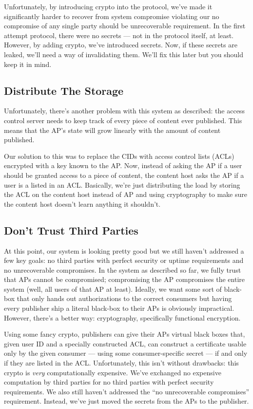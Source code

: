 \documentclass[pdftex,12pt,a4papaer]{report}
\begin{document}
Unfortunately, by introducing crypto into the protocol, we've made it
significantly harder to recover from system compromise violating our no
compromise of any single party should be unrecoverable requirement. In the first
attempt protocol, there were no secrets --- not in the protocol itself, at
least. However, by adding crypto, we've introduced secrets. Now, if these
secrets are leaked, we'll need a way of invalidating them. We'll fix this later
but you should keep it in mind.

\subsection{Distribute The Storage}

Unfortunately, there's another problem with this system as described: the access
control server needs to keep track of every piece of content ever published.
This means that the AP's state will grow linearly with the amount of content
published.

Our solution to this was to replace the CIDs with access control lists (ACLs)
encrypted with a key known to the AP. Now, instead of asking the AP if a user
should be granted access to a piece of content, the content host asks the AP if
a user is a listed in an ACL. Basically, we're just distributing the load by
storing the ACL on the content host instead of AP and using cryptography to make
sure the content host doesn't learn anything it shouldn't.

\subsection{Don't Trust Third Parties}

At this point, our system is looking pretty good but we still haven't addressed
a few key goals: no third parties with perfect security or uptime requirements
and no unrecoverable compromises. In the system as described so far, we fully
trust that APs cannot be compromised; compromising the AP compromises the entire
system (well, all users of that AP at least). Ideally, we want some sort of
black-box that only hands out authorizations to the correct consumers but having
every publisher ship a literal black-box to their APs is obviously
impractical. However, there's a better way: cryptography, specifically
functional encryption.

Using some fancy crypto, publishers can give their APs virtual black boxes
that, given user ID and a specially constructed ACL, can construct a certificate
usable only by the given consumer --- using some consumer-specific secret --- if
and only if they are listed in the ACL. Unfortunately, this isn't without
drawbacks: this crypto is \emph{very} computationally expensive. We've exchanged
no expensive computation by third parties for no third parties with perfect
security requirements. We also still haven't addressed the ``no unrecoverable
compromises'' requirement. Instead, we've just moved the secrets from the APs to
the publisher.
\end{document}

